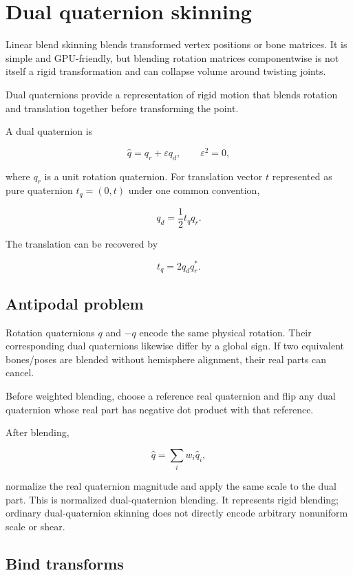 \hypertarget{appendix-921f3f2efb53}{}\label{referencestart:appendix-921f3f2efb53}
\section{Dual quaternion skinning}\label{appendix-921f3f2efb53-dual-quaternion-skinning}

Linear blend skinning blends transformed vertex positions or bone matrices. It is simple and GPU-friendly, but blending rotation matrices componentwise is not itself a rigid transformation and can collapse volume around twisting joints.

Dual quaternions provide a representation of rigid motion that blends rotation and translation together before transforming the point.

A dual quaternion is

\[
\hat q=q_r+\varepsilon q_d,
\qquad \varepsilon^2=0,
\]

where \(q_r\) is a unit rotation quaternion. For translation vector \(t\) represented as pure quaternion \(t_q=(0,t)\) under one common convention,

\[
q_d=\frac12 t_q q_r.
\]

The translation can be recovered by

\[
t_q=2q_dq_r^*.
\]

\subsection{Antipodal problem}\label{appendix-921f3f2efb53-antipodal-problem}

Rotation quaternions \(q\) and \(-q\) encode the same physical rotation. Their corresponding dual quaternions likewise differ by a global sign. If two equivalent bones/poses are blended without hemisphere alignment, their real parts can cancel.

Before weighted blending, choose a reference real quaternion and flip any dual quaternion whose real part has negative dot product with that reference.

After blending,

\[
\hat q = \sum_i w_i \hat q_i,
\]

normalize the real quaternion magnitude and apply the same scale to the dual part. This is normalized dual-quaternion blending. It represents rigid blending; ordinary dual-quaternion skinning does not directly encode arbitrary nonuniform scale or shear.

\subsection{Bind transforms}\label{appendix-921f3f2efb53-bind-transforms}

